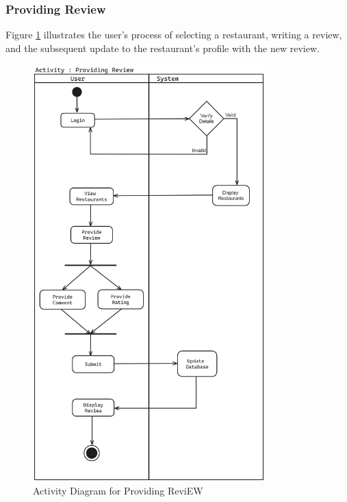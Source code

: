 \documentclass[12pt, a4paper, oneside]{article}
\begin{document}
\subsubsection{Providing Review}
Figure \ref{fig:review} illustrates the user’s process of selecting a restaurant, writing a review, and the subsequent update to the restaurant’s profile with the new review.
\begin{figure}[H]
    \centering
    \includegraphics[width=0.8\textwidth, height=\textheight, keepaspectratio]{images/review.png}
    \caption{Activity Diagram for Providing ReviEW}
    \label{fig:review}
\end{figure}
\pagebreak
\end{document}
